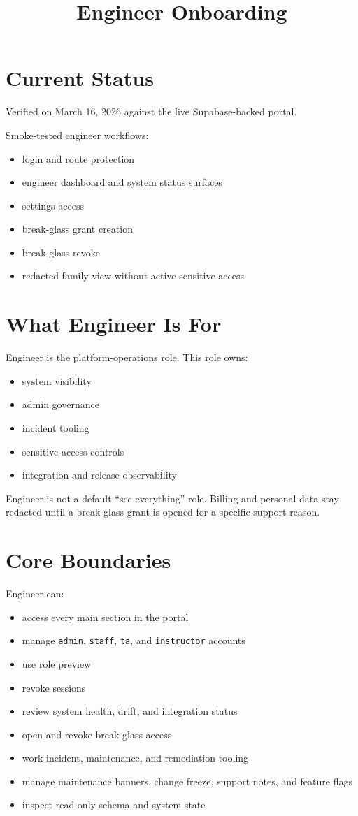 \documentclass[11pt]{article}
\title{Engineer Onboarding}
\author{}
\date{}
\begin{document}
\maketitle

\section*{Current Status}
Verified on March 16, 2026 against the live Supabase-backed portal.

Smoke-tested engineer workflows:
\begin{itemize}
  \item login and route protection
  \item engineer dashboard and system status surfaces
  \item settings access
  \item break-glass grant creation
  \item break-glass revoke
  \item redacted family view without active sensitive access
\end{itemize}

\section*{What Engineer Is For}
Engineer is the platform-operations role. This role owns:
\begin{itemize}
  \item system visibility
  \item admin governance
  \item incident tooling
  \item sensitive-access controls
  \item integration and release observability
\end{itemize}

Engineer is not a default ``see everything'' role. Billing and personal data stay redacted until a break-glass grant is opened for a specific support reason.

\section*{Core Boundaries}
Engineer can:
\begin{itemize}
  \item access every main section in the portal
  \item manage \texttt{admin}, \texttt{staff}, \texttt{ta}, and \texttt{instructor} accounts
  \item use role preview
  \item revoke sessions
  \item review system health, drift, and integration status
  \item open and revoke break-glass access
  \item work incident, maintenance, and remediation tooling
  \item manage maintenance banners, change freeze, support notes, and feature flags
  \item inspect read-only schema and system state
\end{itemize}
\end{document}
